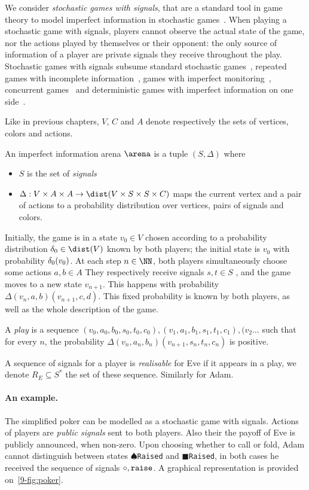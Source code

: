 We consider \emph{stochastic games with signals}, that are a standard tool in game theory to model imperfect information in stochastic games~\cite{sorinafirst,dinahnicolas1,renault2}.
When playing a stochastic game with signals, players cannot observe
the actual state of the game, nor the actions played by themselves or
their opponent: the only source of information of a player are private
signals they receive throughout the play.  Stochastic games with
signals subsume standard stochastic games~\cite{shapley}, repeated
games with incomplete information~\cite{aumann}, games with imperfect
monitoring~\cite{dinahnicolas1}, concurrent games~\cite{dAH00} and
deterministic games with imperfect information on one
side~\cite{reif,chdr07}.

Like in previous chapters, $V$, $C$ and $A$  
denote respectively the sets
	of vertices, colors and actions.
\begin{definition}
An imperfect information arena $\arena$ is a tuple $(S,\Delta)$ where 
\begin{itemize}
	\item $S$ is the set of \emph{signals}
	\item $\Delta : V \times A \times A \to \dist(V \times S \times S \times C)$
	 maps the current vertex and a pair of actions to a probability distribution
	 over vertices, pairs of signals and colors.
\end{itemize}
\end{definition}

Initially, the game is in a state $v_0 \in V$ chosen according to a probability distribution
$\ini\in\dist(V)$ known by both players; the initial state is
$v_0$ with probability $\delta_0(v_0)$.  At each step $n\in\NN$, both players
simultaneously choose some actions $a,b \in A$
 They respectively receive signals
$s,t \in S$ ,
 and the game moves to a
new state $v_{n+1}$.  This happens with probability
$\Delta(v_{n},a,b)(v_{n+1},c,d)$.
{This fixed probability is known by both players,
as well as the whole description of the game.}

A \emph{play} is a sequence $(v_0,a_0,b_0,s_0,t_0,c_0),(v_1,a_1,b_1,s_1,t_1,c_1),(v_2\ldots$
such that for every $n$, the probability $\Delta(v_{n},a_n,b_n)(v_{n+1},s_n,t_n,c_n)$
is positive.

A sequence of signals for a player
is \emph{realisable} for Eve if it appears in a play,
we denote $R_E \subseteq S^*$ the set of these sequence.
Similarly for Adam.


\paragraph{An example.}
The simplified poker can be 
modelled as a stochastic game with signals.
Actions of players are \emph{public signals}
sent to both players.
Also their the payoff of Eve is publicly announced,
when non-zero. 
Upon choosing whether to call or fold,
Adam cannot distinguish between states
$\spadesuit${\tt Raised} and $\blacksquare${\tt Raised},
in both cases he received the sequence of signals $\circ,{\tt raise}$.
A graphical representation is provided on~\cref{9-fig:poker}.

